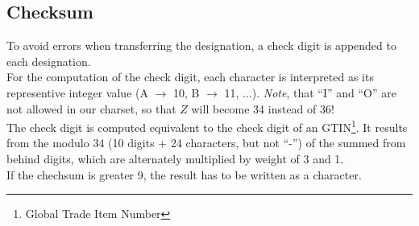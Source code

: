 %
%
%
%
%
%
%

\subsection{Checksum}

To avoid errors when transferring the designation, a check digit is appended to
each designation. \\

For the computation of the check digit, each character is interpreted as its
representive integer value (A $\rightarrow$ 10, B $\rightarrow$ 11, ...).
\textit{Note}, that ``I'' and ``O'' are not allowed in our charset, so that $Z$
will become 34 instead of 36! \\

The check digit is computed equivalent to the check digit of an
GTIN\footnote{Global Trade Item Number}. It results from the modulo 34 (10
digits + 24 characters, but not ``-'') of the summed from behind digits, which
are alternately multiplied by weight of 3 and 1. \\

If the chechsum is greater 9, the result has to be written as a character. \\


